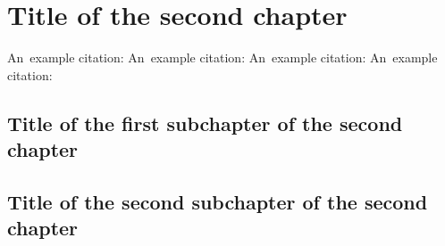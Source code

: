 \chapter{Title of the second chapter}
An~example citation: \cite{Delmonte2014}
An~example citation: \cite{Malmi2016}
An~example citation: \cite{Shi2017}
An~example citation: \cite{Zhang2014}
\section{Title of the first subchapter of the second chapter}

\section{Title of the second subchapter of the second chapter}
